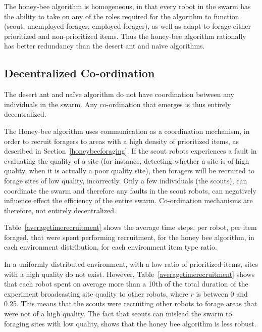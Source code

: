 The honey-bee algorithm is homogeneous, in that every robot in the swarm has the ability to take on any of the roles required for the algorithm to function (scout, unemployed forager, employed forager), as well as adapt to forage either prioritized and non-prioritized items. Thus the honey-bee algorithm rationally has better redundancy than the desert ant and na\"ive algorithms.

\subsection{Decentralized Co-ordination}
\label{results:decentralizedcoordination}


The desert ant and na\"ive algorithm do not have coordination between any individuals in the swarm. Any co-ordination that emerges is thus entirely decentralized. 

The Honey-bee algorithm uses communication as a coordination mechanism, in order to recruit foragers to areas with a high density of prioritized items, as described in Section~\ref{honeybeeforaging}. If the scout robots experiences a fault in evaluating the quality of a site (for instance, detecting whether a site is of high quality, when it is actually a poor quality site), then foragers will be recruited to forage sites of low quality, incorrectly. Only a few individuals (the scouts), can coordinate the swarm and therefore any faults in the scout robots, can negatively influence effect the efficiency of the entire swarm. Co-ordination mechanisms are therefore, not entirely decentralized.

Table~\ref{averagetimerecruitment} shows the average time steps, per robot, per item foraged, that were spent performing recruitment, for the honey bee algorithm, in each environment distribution, for each environment item type ratio. 

In a uniformly distributed environment, with a low ratio of prioritized items, sites with a high quality do not exist. However, Table~\ref{averagetimerecruitment} shows that each robot spent on average more than a 10th of the total duration of the experiment broadcasting site quality to other robots, where $r$ is between 0 and 0.25. This means that the scouts were recruiting other robots to forage areas that were not of a high quality. The fact that scouts can mislead the swarm to foraging sites with low quality, shows that the honey bee algorithm is less robust.

